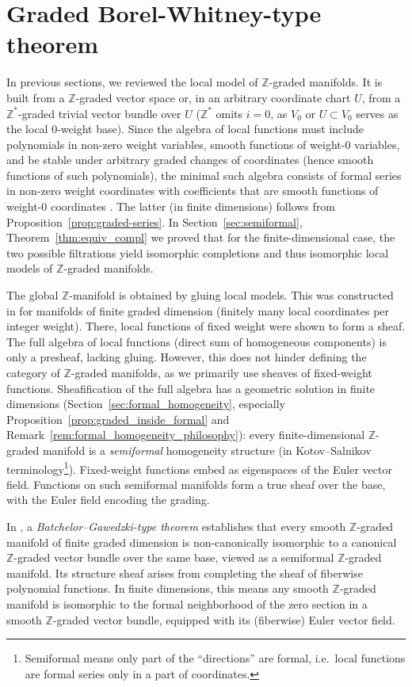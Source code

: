\documentclass[a4paper,12pt]{amsart}
\newcommand{\Z}{{\mathbb Z}}
\begin{document}
\section{Graded Borel-Whitney-type theorem}\label{sec:global_Borel}

\noindent In previous sections, we reviewed the local model of $\Z$-graded manifolds. It is built from a $\Z$-graded vector space or, in an arbitrary coordinate chart $U$, from a $\Z^*$-graded trivial vector bundle over $U$ ($\Z^*$ omits $i=0$, as $V_0$ or $U\subset V_0$ serves as the local $0$-weight base). 
Since the algebra of local functions must include polynomials in non-zero weight variables, smooth functions of weight-$0$ variables, and be stable under arbitrary graded changes of coordinates (hence smooth functions of such polynomials), the minimal such algebra consists of formal series in non-zero weight coordinates with coefficients that are smooth functions of weight-$0$ coordinates \cite{KS2024}. The latter (in finite dimensions) follows from Proposition~\ref{prop:graded-series}. 
In Section~\ref{sec:semiformal}, Theorem~\ref{thm:equiv_compl} we proved that for the finite-dimensional case, the two possible filtrations yield isomorphic completions and thus isomorphic local models of $\Z$-graded manifolds.

\smallskip\noindent 
The global $\Z$-manifold is obtained by gluing local models. This was constructed in \cite{KS2024} for manifolds of finite graded dimension (finitely many local coordinates per integer weight). There, local functions of fixed weight were shown to form a sheaf. 
The full algebra of local functions (direct sum of homogeneous components) is only a presheaf, lacking gluing. However, this does not hinder defining the category of $\Z$-graded manifolds, as we primarily use sheaves of fixed-weight functions. 
Sheafification of the full algebra has a geometric solution in finite dimensions (Section~\ref{sec:formal_homogeneity}, especially Proposition~\ref{prop:graded_inside_formal} and Remark~\ref{rem:formal_homogeneity_philosophy}): every finite-dimensional $\Z$-graded manifold is a \emph{semiformal} homogeneity structure (in Kotov--Salnikov terminology\footnote{Semiformal means only part of the ``directions'' are formal, i.e.\ local functions are formal series only in a part of coordinates.}). Fixed-weight functions embed as eigenspaces of the Euler vector field. Functions on such semiformal manifolds form a true sheaf over the base, with the Euler field encoding the grading.

\smallskip\noindent In \cite{KS2024}, a \emph{Batchelor--Gawedzki-type theorem} establishes that every smooth $\Z$-graded manifold of finite graded dimension is non-canonically isomorphic to a canonical $\Z$-graded vector bundle over the same base, viewed as a semiformal $\Z$-graded manifold. Its structure sheaf arises from completing the sheaf of fiberwise polynomial functions. In finite dimensions, this means any smooth $\Z$-graded manifold is isomorphic to the formal neighborhood of the zero section in a smooth $\Z$-graded vector bundle, equipped with its (fiberwise) Euler vector field.
\end{document}
